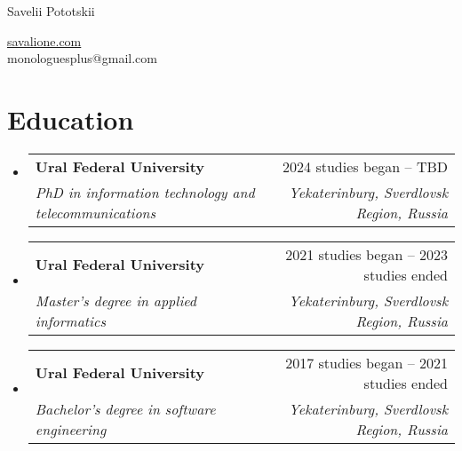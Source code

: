 \documentclass[letterpaper,11pt]{article}
\makeatletter
\newcommand{\resumeItem}[1]{
    \item{
                {#1 \vspace{-4pt}}
          }
}
\newcommand{\resumeSubheading}[4]{
    \vspace{-2pt}\item
    \begin{tabular*}{0.97\textwidth}[t]{l@{\extracolsep{\fill}}r}
        \textbf{#1} & #2 \\
        \textit{\small #3} & \textit{\small #4} \\
    \end{tabular*}\vspace{-10pt}
}
\newcommand{\resumeSubHeadingListStart}{\begin{itemize}[leftmargin=0.15in, label={}]}
\newcommand{\resumeSubHeadingListEnd}{\end{itemize}}
\newcommand{\resumeItemListStart}{\begin{itemize}}
\newcommand{\resumeItemListEnd}{\end{itemize}\vspace{-2pt}}
\makeatother
\begin{document}
\begin{center}
    {\LARGE Savelii Pototskii} \\ \vspace{0pt}
    \begin{multicols}{2}
        \begin{flushleft}
        \end{flushleft}

        \begin{flushright}
            \href{https://savalione.com}{savalione.com} \\

            \href{mailto:{monologuesplus@gmail.com}} \large{monologuesplus@gmail.com}
        \end{flushright}
    \end{multicols}
\end{center}

\section{Education}
\resumeSubHeadingListStart

\resumeSubheading
    {Ural Federal University}{2024 studies began -- TBD}
    {PhD in information technology and telecommunications}{Yekaterinburg, Sverdlovsk Region, Russia}
\resumeSubheading
    {Ural Federal University}{2021 studies began -- 2023 studies ended}
    {Master's degree in applied informatics}{Yekaterinburg, Sverdlovsk Region, Russia}
\resumeSubheading
    {Ural Federal University}{2017 studies began -- 2021 studies ended}
    {Bachelor's degree in software engineering}{Yekaterinburg, Sverdlovsk Region, Russia}

\resumeSubHeadingListEnd


\end{document}

